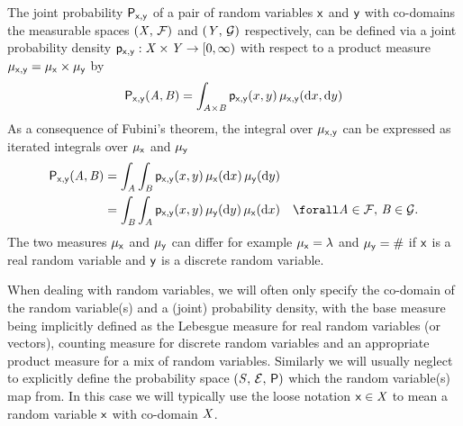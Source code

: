 The joint probability $\mathsf{P}_{\mathsf{x},\mathsf{y}}$ of a pair of random variables $\mathsf{x}$ and $\mathsf{y}$ with co-domains the measurable spaces $(\mathit{X},\,\mathcal{F})$ and $(\mathit{Y},\,\mathcal{G})$ respectively, can be defined via a joint probability density $\mathsf{p}_{\mathsf{x},\mathsf{y}} : \mathit{X} \times \mathit{Y} \to [0,\infty)$ with respect to a product measure $\mu_{\mathsf{x},\mathsf{y}} = \mu_{\mathsf{x}} \times \mu_{\mathsf{y}}$ by
\begin{equation}\label{eq:real-rv-joint-prob-dens}
  \mathsf{P}_{\mathsf{x},\mathsf{y}}(\mathit{A},\mathit{B}) =
  \int_{\mathit{A}\times\mathit{B}} 
    \mathsf{p}_{\mathsf{x},\mathsf{y}}(x,y)
  \,\mu_{\mathsf{x},\mathsf{y}}(\mathrm{d} x, \mathrm{d} y) 
\end{equation}
As a consequence of Fubini's theorem, the integral over $\mu_{\mathsf{x},\mathsf{y}}$ can be expressed as iterated integrals over $\mu_{\mathsf{x}}$ and $\mu_{\mathsf{y}}$
\begin{equation}
\begin{split}
  \prob{\rvar{x},\rvar{y}}(\set{A},\set{B})&=
  \int_{\set{A}} \int_{\set{B}}
    \pden{\rvar{x},\rvar{y}}(x,y)
  \,\mu_{\rvar{x}}(\dr x)\,\mu_{\rvar{y}}(\dr y)
  \\  
  &=
  \int_{\set{B}} \int_{\set{A}}
    \pden{\rvar{x},\rvar{y}}(x,y)
  \,\mu_{\rvar{y}}(\dr y)\,\mu_{\rvar{x}}(\dr x)
  \quad \forall \set{A} \in \sset{F}, \,\set{B} \in \sset{G}.
\end{split}
\end{equation}
The two measures $\mu_{\mathsf{x}}$ and $\mu_{\mathsf{y}}$ can differ for example $\mu_{\rvar{x}} = \lebm{1}$ and $\mu_{\mathsf{y}} = \#$ if $\mathsf{x}$ is a real random variable and $\mathsf{y}$ is a discrete random variable.

When dealing with random variables, we will often only specify the co-domain of the random variable(s) and a (joint) probability density, with the base measure being implicitly defined as the Lebesgue measure for real random variables (or vectors), counting measure for discrete random variables and an appropriate product measure for a mix of random variables. Similarly we will usually neglect to explicitly define the probability space $(\mathit{S},\,\mathcal{E},\,\mathsf{P})$ which the random variable(s) map from. In this case we will typically use the loose notation $\mathsf{x} \in \mathit{X}$ to mean a random variable $\mathsf{x}$ with co-domain $\mathit{X}$. 

